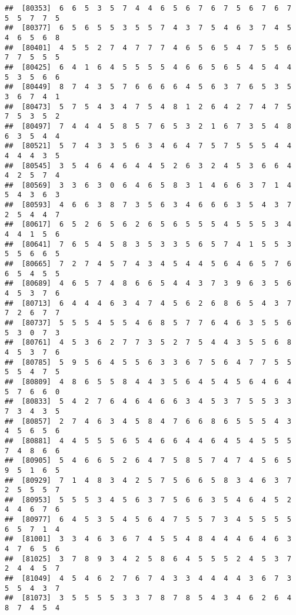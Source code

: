 \documentclass[
]{book}
\begin{document}
\begin{verbatim}
##  [80353]  6  6  5  3  5  7  4  4  6  5  6  7  6  7  5  6  7  6  7  5  5  7  7  5
##  [80377]  6  5  6  5  5  3  5  5  7  4  3  7  5  4  6  3  7  4  5  4  6  5  6  8
##  [80401]  4  5  5  2  7  4  7  7  7  4  6  5  6  5  4  7  5  5  6  7  7  5  5  5
##  [80425]  6  4  1  6  4  5  5  5  5  4  6  6  5  6  5  4  5  4  4  5  3  5  6  6
##  [80449]  8  7  4  3  5  7  6  6  6  6  4  5  6  3  7  6  5  3  5  3  6  7  4  1
##  [80473]  5  7  5  4  3  4  7  5  4  8  1  2  6  4  2  7  4  7  5  7  5  3  5  2
##  [80497]  7  4  4  4  5  8  5  7  6  5  3  2  1  6  7  3  5  4  8  6  3  5  4  4
##  [80521]  5  7  4  3  3  5  6  3  4  6  4  7  5  7  5  5  5  4  4  4  4  4  3  5
##  [80545]  3  5  4  6  4  6  4  4  5  2  6  3  2  4  5  3  6  6  4  4  2  5  7  4
##  [80569]  3  3  6  3  0  6  4  6  5  8  3  1  4  6  6  3  7  1  4  5  4  3  6  3
##  [80593]  4  6  6  3  8  7  3  5  6  3  4  6  6  6  3  5  4  3  7  2  5  4  4  7
##  [80617]  6  5  2  6  5  6  2  6  5  6  5  5  5  4  5  5  5  3  4  4  4  1  5  6
##  [80641]  7  6  5  4  5  8  3  5  3  3  5  6  5  7  4  1  5  5  3  5  5  6  6  5
##  [80665]  7  2  7  4  5  7  4  3  4  5  4  4  5  6  4  6  5  7  6  6  5  4  5  5
##  [80689]  4  6  5  7  4  8  6  6  5  4  4  3  7  3  9  6  3  5  6  4  5  3  7  6
##  [80713]  6  4  4  4  6  3  4  7  4  5  6  2  6  8  6  5  4  3  7  7  2  6  7  7
##  [80737]  5  5  5  4  5  5  4  6  8  5  7  7  6  4  6  3  5  5  6  5  3  0  7  3
##  [80761]  4  5  3  6  2  7  7  3  5  2  7  5  4  4  3  5  5  6  8  4  5  3  7  6
##  [80785]  5  9  5  6  4  5  5  6  3  3  6  7  5  6  4  7  7  5  5  5  5  4  7  5
##  [80809]  4  8  6  5  5  8  4  4  3  5  6  4  5  4  5  6  4  6  4  5  7  6  6  0
##  [80833]  5  4  2  7  6  4  6  4  6  6  3  4  5  3  7  5  5  3  3  7  3  4  3  5
##  [80857]  2  7  4  6  3  4  5  8  4  7  6  6  8  6  5  5  5  4  3  4  5  6  5  6
##  [80881]  4  4  5  5  5  6  5  4  6  6  4  4  6  4  5  4  5  5  5  7  4  8  6  6
##  [80905]  5  4  6  6  5  2  6  4  7  5  8  5  7  4  7  4  5  6  5  9  5  1  6  5
##  [80929]  7  1  4  8  3  4  2  5  7  5  6  6  5  8  3  4  6  3  7  2  5  5  5  7
##  [80953]  5  5  5  3  4  5  6  3  7  5  6  6  3  5  4  6  4  5  2  4  4  6  7  6
##  [80977]  6  4  5  3  5  4  5  6  4  7  5  5  7  3  4  5  5  5  5  6  5  7  1  4
##  [81001]  3  3  4  6  3  6  7  4  5  5  4  8  4  4  4  6  4  6  3  4  7  6  5  6
##  [81025]  3  7  8  9  3  4  2  5  8  6  4  5  5  5  2  4  5  3  7  2  4  4  5  7
##  [81049]  4  5  4  6  2  7  6  7  4  3  3  4  4  4  4  3  6  7  3  5  5  4  3  7
##  [81073]  3  5  5  5  5  3  3  7  8  7  8  5  4  3  4  6  2  6  4  8  7  4  5  4

\end{verbatim}
\end{document}
